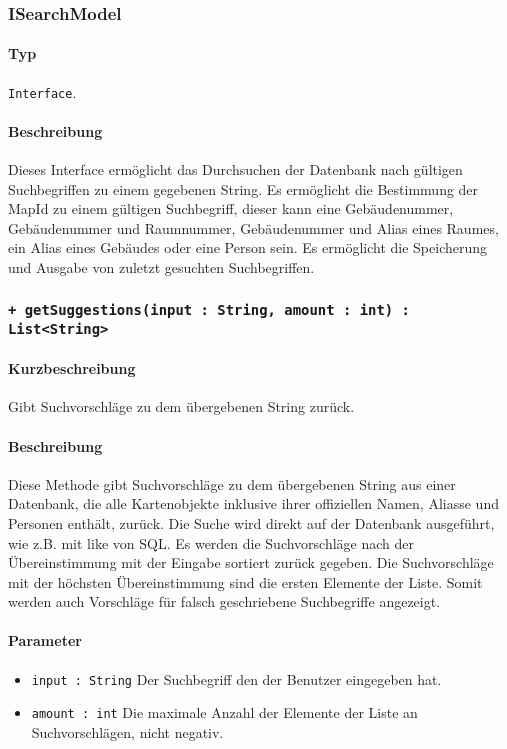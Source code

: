 \subsubsection{ISearchModel}\label{App_Search_ISearchModel}
\paragraph*{Typ}
\texttt{Interface}.
\paragraph*{Beschreibung}
Dieses Interface ermöglicht das Durchsuchen der Datenbank nach gültigen Suchbegriffen zu einem gegebenen String.
Es ermöglicht die Bestimmung der MapId zu einem gültigen Suchbegriff, 
dieser kann eine Gebäudenummer, Gebäudenummer und Raumnummer, Gebäudenummer und Alias eines Raumes, ein Alias eines Gebäudes oder eine Person sein.
Es ermöglicht die Speicherung und Ausgabe von zuletzt gesuchten Suchbegriffen.

 \subsubsection*{\texttt{+ getSuggestions(input : String, amount : int) : List<String>}}\label{App_Search_ISearchModel_getSuggestions}%
\paragraph*{Kurzbeschreibung}
Gibt Suchvorschläge zu dem übergebenen String zurück.
\paragraph*{Beschreibung}
Diese Methode gibt Suchvorschläge zu dem übergebenen String aus einer Datenbank, 
die alle Kartenobjekte inklusive ihrer offiziellen Namen, Aliasse und Personen enthält, zurück.
Die Suche wird direkt auf der Datenbank ausgeführt, wie z.B. mit \dq like \dq{} von SQL.
Es werden die Suchvorschläge nach der Übereinstimmung mit der Eingabe sortiert zurück gegeben.
Die Suchvorschläge mit der höchsten Übereinstimmung sind die ersten Elemente der Liste.
Somit werden auch Vorschläge für falsch geschriebene Suchbegriffe angezeigt.
\paragraph*{Parameter}
\begin{itemize}
    \item \texttt{input : String} Der Suchbegriff den der Benutzer eingegeben hat.
    \item \texttt{amount : int} Die maximale Anzahl der Elemente der Liste an Suchvorschlägen, nicht negativ.
\end{itemize}
